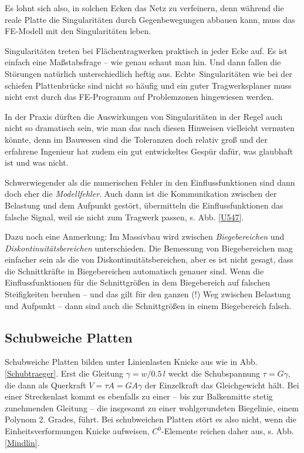 Es lohnt sich also, in solchen Ecken das Netz zu verfeinern, denn w\"{a}hrend die reale Platte die Singularit\"{a}ten durch Gegenbewegungen abbauen kann, muss das FE-Modell mit den Singularit\"{a}ten leben.

Singularit\"{a}ten treten bei Fl\"{a}chentragwerken praktisch in jeder Ecke auf. Es ist einfach eine Ma{\ss}stabsfrage -- wie genau schaut man hin. Und dann fallen die St\"{o}rungen nat\"{u}rlich unterschiedlich heftig aus. \glq Echte\grq\ Singularit\"{a}ten wie bei der schiefen Plattenbr\"{u}cke sind nicht so h\"{a}ufig und ein guter Tragwerksplaner muss nicht erst durch das FE-Programm auf Problemzonen hingewiesen werden.

In der Praxis d\"{u}rften die Auswirkungen von Singularit\"{a}ten in der Regel auch nicht so dramatisch sein, wie man das nach diesen Hinweisen vielleicht vermuten k\"{o}nnte, denn im Bauwesen sind die Toleranzen doch relativ gro{\ss} und der erfahrene Ingenieur hat zudem ein gut entwickeltes Gesp\"{u}r daf\"{u}r, was glaubhaft ist und was nicht.

Schwerwiegender als die numerischen Fehler in den Einflussfunktionen sind dann doch eher die {\em Modellfehler\/}. Auch dann ist die Kommunikation zwischen der Belastung und dem Aufpunkt gest\"{o}rt, \"{u}bermitteln die Einflussfunktionen das falsche Signal, weil sie nicht zum Tragwerk passen, s. Abb. \ref{U547}.

Dazu noch eine Anmerkung: Im Massivbau wird zwischen {\em Biegebereichen\/} und {\em Diskontinuit\"{a}tsbereichen\/}  unterschieden. Die Bemessung von Biegebereichen mag einfacher sein als die von Diskontinuit\"{a}tsbereichen, aber es ist nicht gesagt, dass die Schnittkr\"{a}fte in Biegebereichen automatisch genauer sind. Wenn die Einflussfunktionen f\"{u}r die Schnittgr\"{o}{\ss}en in dem Biegebereich auf falschen Steifigkeiten beruhen -- und das gilt f\"{u}r den ganzen (!) Weg zwischen Belastung und Aufpunkt -- dann sind auch die Schnittgr\"{o}{\ss}en in einem Biegebereich falsch.


{\textcolor{sectionTitleBlue}{\section{Schubweiche Platten}}}\label{Schubweiche Platten}
Schubweiche Platten bilden unter Linienlasten Knicke aus wie in Abb. \ref{Schubtraeger}. Erst die Gleitung $\gamma = w/0.5\,l$ weckt die Schubspannung $\tau = G \gamma$, die dann als Querkraft $ V = \tau A = G A \gamma$ der Einzelkraft das Gleichgewicht h\"{a}lt. Bei einer Streckenlast kommt es ebenfalls zu einer -- bis zur Balkenmitte stetig zunehmenden Gleitung -- die insgesamt zu einer wohlgerundeten Biegelinie, einem Polynom 2. Grades, f\"{u}hrt. Bei schubweichen Platten st\"{o}rt es also nicht, wenn die Einheitsverformungen Knicke aufweisen, $C^0$-Elemente reichen daher aus, s. Abb. \ref{Mindlin}.

